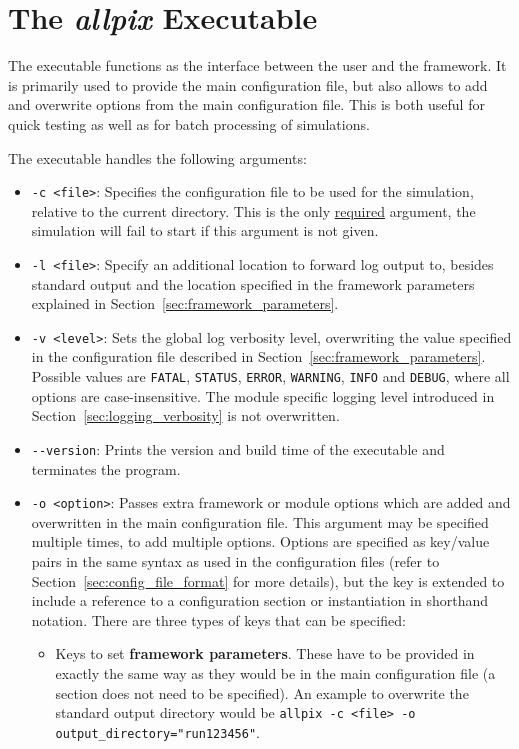 \section{The \textit{allpix} Executable}
\label{sec:allpix_executable}
The  executable functions as the interface between the user and the framework. It is primarily used to provide the main configuration file, but also allows to add and overwrite options from the main configuration file. This is both useful for quick testing as well as for batch processing of simulations.

The executable handles the following arguments:
\begin{itemize}
\item \texttt{-c <file>}: Specifies the configuration file to be used for the simulation, relative to the current directory.
This is the only \underline{required} argument, the simulation will fail to start if this argument is not given.
\item \texttt{-l <file>}: Specify an additional location to forward log output to, besides standard output and the location specified in the framework parameters explained in Section~\ref{sec:framework_parameters}.
\item \texttt{-v <level>}: Sets the global log verbosity level, overwriting the value specified in the configuration file described in Section~\ref{sec:framework_parameters}.
Possible values are \texttt{FATAL}, \texttt{STATUS}, \texttt{ERROR}, \texttt{WARNING}, \texttt{INFO} and \texttt{DEBUG}, where all options are case-insensitive.
The module specific logging level introduced in Section~\ref{sec:logging_verbosity} is not overwritten.
\item \texttt{-{}-version}: Prints the version and build time of the executable and terminates the program.
\item \texttt{-o <option>}: Passes extra framework or module options which are added and overwritten in the main configuration file.
This argument may be specified multiple times, to add multiple options.
Options are specified as key/value pairs in the same syntax as used in the configuration files (refer to Section~\ref{sec:config_file_format} for more details), but the key is extended to include a reference to a configuration section or instantiation in shorthand notation.
There are three types of keys that can be specified:
\begin{itemize}
\item Keys to set \textbf{framework parameters}. These have to be provided in exactly the same way as they would be in the main configuration file (a section does not need to be specified). An example to overwrite the standard output directory would be \texttt{allpix -c <file> -o output\_directory="run123456"}.

\end{itemize}
\end{itemize}

